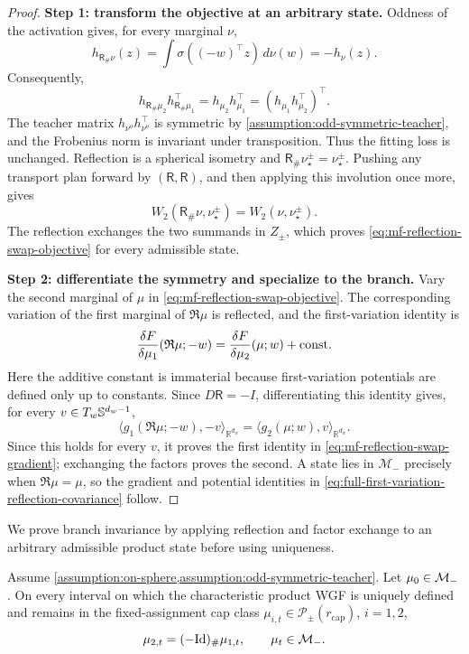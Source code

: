 \begin{proof}
\noindent\textbf{Step 1: transform the objective at an arbitrary state.}
Oddness of the activation gives, for every marginal \(\nu\),
\[
 h_{\mathsf R_\#\nu}(z)
 =\int\sigma((-w)^\top z)\,d\nu(w)=-h_\nu(z).
\]
Consequently,
\[
 h_{\mathsf R_\#\mu_2}h_{\mathsf R_\#\mu_1}^\top
 =h_{\mu_2}h_{\mu_1}^\top
 =(h_{\mu_1}h_{\mu_2}^\top)^\top.
\]
The teacher matrix \(h_{\nu^o}h_{\nu^o}^\top\) is symmetric by
\cref{assumption:odd-symmetric-teacher}, and the Frobenius norm is invariant
under transposition.  Thus the fitting loss is unchanged.  Reflection is a
spherical isometry and \(\mathsf R_\#\nu_\star^\pm=\nu_\star^\pm\).  Pushing
any transport plan forward by \((\mathsf R,\mathsf R)\), and then applying
this involution once more, gives
\[
 W_2(\mathsf R_\#\nu,\nu_\star^\pm)=W_2(\nu,\nu_\star^\pm).
\]
The reflection exchanges the two summands in \(Z_\pm\), which proves
\cref{eq:mf-reflection-swap-objective} for every admissible state.

\par\noindent\textbf{Step 2: differentiate the symmetry and specialize to the branch.}
Vary the second marginal of \(\mu\) in
\cref{eq:mf-reflection-swap-objective}.  The corresponding variation of the
first marginal of \(\mathfrak R\mu\) is reflected, and
the first-variation identity is
\[
 \frac{\delta F}{\delta \mu_1}(\mathfrak R\mu;-w)
 =\frac{\delta F}{\delta \mu_2}(\mu;w)+\mathrm{const}.
\]
Here the additive constant is immaterial because first-variation potentials
are defined only up to constants.  Since \(D\mathsf R=-I\), differentiating
this identity gives, for every \(v\in T_w\mathbb{S}^{d_w-1}\),
\[
 \langle g_1(\mathfrak R\mu;-w),-v\rangle_{\mathbb R^{d_w}}
 =\langle g_2(\mu;w),v\rangle_{\mathbb R^{d_w}}.
\]
Since this holds for every \(v\), it proves the first identity in
\cref{eq:mf-reflection-swap-gradient}; exchanging the factors proves the
second.  A state lies in \(\mathcal M_-\) precisely when
\(\mathfrak R\mu=\mu\), so the gradient and potential identities in
\cref{eq:full-first-variation-reflection-covariance} follow.
\end{proof}

We prove branch invariance by applying reflection and factor exchange
to an arbitrary admissible product state before using uniqueness.
\begin{proposition}
\label{lem:invariance-antisymmetric-branch}
Assume \cref{assumption:on-sphere,assumption:odd-symmetric-teacher}.
Let \(\mu_0\in\mathcal{M}_{-}\). On every interval on which
the characteristic product WGF is uniquely defined and remains in the
fixed-assignment cap class \(\mu_{i,t}\in\mathcal P_\pm(r_{\mathrm{cap}})\), \(i=1,2\),
\[
 \mu_{2,t}=(-\mathrm{Id})_\#\mu_{1,t},
 \qquad \mu_t\in\mathcal{M}_{-}.
\]
\end{proposition}

